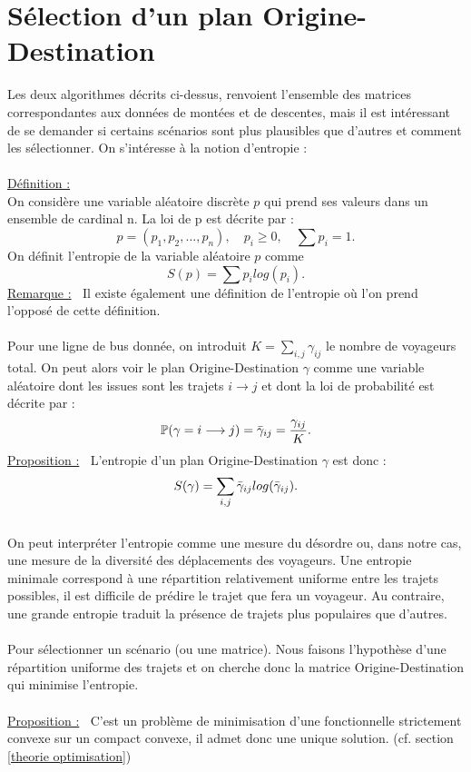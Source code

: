 \documentclass[12pt]{article}
\newcommand{\defin}{\underline{Définition :} }
\newcommand{\rmq}{\underline{Remarque :} }
\newcommand{\prop}{\underline{Proposition :} }
\begin{document}
\section{Sélection d'un plan Origine-Destination}
Les deux algorithmes décrits ci-dessus, renvoient l'ensemble des matrices correspondantes aux données de montées et de descentes, mais il est intéressant de se demander si certains scénarios sont plus plausibles que d'autres et comment les sélectionner. On s'intéresse à la notion d'entropie :\\
\\
\defin\\
On considère une variable aléatoire discrète $p$ qui prend ses valeurs dans un ensemble de cardinal n. La loi de p est décrite par :
\[p = (p_1,p_2,...,p_n),\quad p_i \geq 0,\quad \sum p_i = 1.\]
On définit l'entropie de la variable aléatoire $p$ comme
\[S(p) = \sum p_i log(p_i).\]
\rmq $\:$
Il existe également une définition de l'entropie où l'on prend l'opposé de cette définition.\\
\\
\label{def entropie plan OD}Pour une ligne de bus donnée, on introduit $K = \sum_{i,j} \gamma_{ij} $ le nombre de voyageurs total. On peut alors voir le plan Origine-Destination $\gamma$ comme une variable aléatoire dont les issues sont les trajets $i \longrightarrow j$ et dont la loi de probabilité est décrite par :
\[
\mathbb{P}(\gamma = i \longrightarrow j) = \Bar{\gamma}_{ij} = \frac{\gamma_{ij}}{K}.
\]
\prop $\:$ L'entropie d'un plan Origine-Destination $\gamma$ est donc :
\[S(\gamma) = \sum_{i,j}\Bar{\gamma}_{ij}log(\Bar{\gamma}_{ij}).
\]
\\
On peut interpréter l'entropie comme une mesure du désordre ou, dans notre cas, une mesure de la diversité des déplacements des voyageurs. Une entropie minimale correspond à une répartition relativement uniforme entre les trajets possibles, il est difficile de prédire le trajet que fera un voyageur. Au contraire, une grande entropie traduit la présence de trajets plus populaires que d'autres.\\
\\
Pour sélectionner un scénario (ou une matrice). Nous faisons l'hypothèse d'une répartition uniforme des trajets et on cherche donc la matrice Origine-Destination qui minimise l'entropie.\\
 \\
\prop$\:$ C'est un problème de minimisation d'une fonctionnelle strictement convexe sur un compact convexe, il admet donc une unique solution. (cf. section \ref{theorie optimisation})
\end{document}
